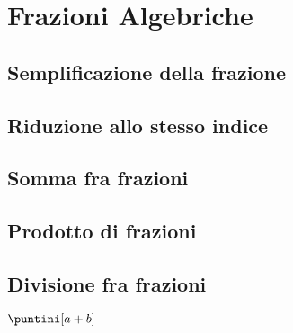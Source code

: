\chapter{Frazioni Algebriche}
\label{cha:FrazioniAlgebriche}
\section{Semplificazione della frazione }
\section{Riduzione allo stesso indice}
\section{Somma fra frazioni}
\section{Prodotto di frazioni}
\section{Divisione fra frazioni}



$\puntini[a+b]$